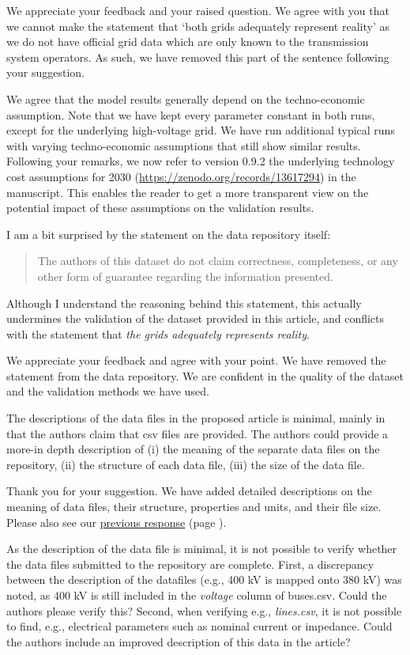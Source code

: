 \documentclass{response}
\begin{document}
\AR We appreciate your feedback and your raised question. We agree with you that we cannot make the statement that `both grids adequately represent reality' as we do not have official grid data which are only known to the transmission system operators. As such, we have removed this part of the sentence following your suggestion.

We agree that the model results generally depend on the techno-economic assumption. Note that we have kept every parameter constant in both runs, except for the underlying high-voltage grid. We have run additional typical runs with varying techno-economic assumptions that still show similar results. Following your remarks, we now refer to version 0.9.2 the underlying technology cost assumptions for 2030 (\href{https://zenodo.org/records/13617294}{https://zenodo.org/records/13617294}) \cite{lisazeyenPyPSATechnologydataV0922024} in the manuscript. This enables the reader to get a more transparent view on the potential impact of these assumptions on the validation results.

\RC I am a bit surprised by the statement on the data repository itself: 
\begin{quote}
    The authors of this dataset do not claim correctness, completeness, or any other form of guarantee regarding the information presented.
\end{quote}
Although I understand the reasoning behind this statement, this actually undermines the validation of the dataset provided in this article, and conflicts with the statement that \textit{the grids adequately represents reality}.

\AR We appreciate your feedback and agree with your point. We have removed the statement from the data repository. We are confident in the quality of the dataset and the validation methods we have used. 

\RC The descriptions of the data files in the proposed article is minimal, mainly in that the authors claim that csv files are provided. The authors could provide a more-in depth description of (i) the meaning of the separate data files on the repository, (ii) the structure of each data file, (iii) the size of the data file.

\AR Thank you for your suggestion. We have added detailed descriptions on the meaning of data files, their structure, properties and units, and their file size. Please also see our \hyperref[ac:datarecords]{previous response} (page \pageref{ac:datarecords}). 

\RC As the description of the data file is minimal, it is not possible to verify whether the data files submitted to the repository are complete. First, a discrepancy between the description of the datafiles (e.g., 400 kV is mapped onto 380 kV) was noted, as 400 kV is still included in the \textit{voltage} column of buses.csv. Could the authors please verify this? Second, when verifying e.g., \textit{lines.csv}, it is not possible to find, e.g., electrical parameters such as nominal current or impedance. Could the authors include an improved description of this data in the article?
\end{document}
